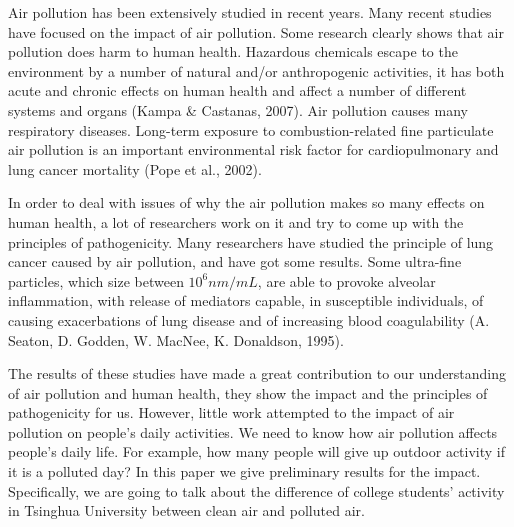 Air pollution has been extensively studied in recent years. Many recent studies have focused on the impact of air pollution. Some research clearly shows that air pollution does harm to human health. Hazardous chemicals escape to the environment by a number of natural and/or anthropogenic activities, it has both acute and chronic effects on human health and affect a number of different systems and organs (Kampa \& Castanas, 2007). Air pollution causes many  respiratory diseases. Long-term exposure to combustion-related fine particulate air pollution is an important environmental risk factor for cardiopulmonary and lung cancer mortality (Pope et al., 2002). 

In order to deal with issues of why the air pollution makes so many effects on human health, a lot of researchers work on it and try to come up with the principles of pathogenicity. Many researchers have studied the principle of lung cancer caused by air pollution, and have got some results. Some ultra-fine particles, which size between $10^6nm/mL$, are able to provoke alveolar inflammation, with release of mediators capable, in susceptible individuals, of causing exacerbations of lung disease and of increasing blood coagulability (A. Seaton, D. Godden, W. MacNee, K. Donaldson, 1995). 

The results of these studies have made a great contribution to our understanding of air pollution and human health, they show the impact and the principles of pathogenicity for us. However, little work attempted to the impact of air pollution on people’s daily activities. We need to know how air pollution affects people's daily life. For example, how many people will give up outdoor activity if it is a polluted day? In this paper we give preliminary results for the impact. Specifically, we are going to talk about the difference of college students’ activity in Tsinghua University between clean air and polluted air. 

